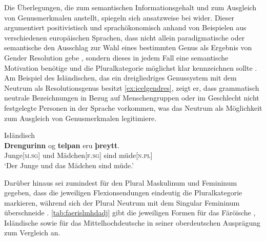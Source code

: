 Die Überlegungen, die \citeauthor{askedal1973} zum semantischen
Informationsgehalt und zum Ausgleich von Genusmerkmalen anstellt, spiegeln sich
ansatzweise bei \citet{corbett1991} wider. Dieser argumentiert positivistisch
und sprachökonomisch anhand von Beispielen aus verschiedenen europäischen
Sprachen, dass nicht allein paradigmatische oder semantische
 den Ausschlag zur Wahl eines bestimmten Genus als Ergebnis
von Gender Resolution gebe \autocite[290--293]{corbett1991}, sondern dieses
 in jedem Fall eine semantische Motivation benötige und
die Plural\-kategorie möglichst klar kennzeichnen sollte
\autocite[293--299]{corbett1991}. Am Beispiel des Isländischen, das ein
dreigliedriges Genussystem mit dem Neutrum als Resolutionsgenus besitzt
\cref{ex:icelgendres}, zeigt er, dass grammatisch neutrale Bezeichnungen in
Bezug auf Menschen\-gruppen oder im Geschlecht nicht festgelegte Personen in
der Sprache vorkommen, was das Neutrum als Möglichkeit zum Ausgleich von
Genusmerkmalen legiti\-miere.

\begin{exe}
\ex \label{ex:icelgendres}
	Isländisch \parencites[nach][283]{corbett1991}[569]{wechsler2009}\\
	\gll \textbf{Drengurinn} og \textbf{telpan} eru \textbf{þreytt}. \\
		Junge[\textsc{m.sg}] und Mädchen[\textsc{f.sg}] sind
		müde[\textsc{n.pl}] \\
	\trans `Der Junge und das Mädchen sind müde.'
\end{exe}

Darüber hinaus sei zumindest für den Plural Maskulinum und Femininum gegeben,
dass die jeweiligen Flexions\-endungen eindeutig die Pluralkategorie markieren,
während sich der Plural Neutrum mit dem Singular Femininum überschneide
\autocite[298--299]{corbett1991}. \cref{tab:faerislmhdadj} gibt die jeweiligen
Formen für das Färöische \autocite[100--101]{thrainsson2004}, Isländische
\autocite[84--90]{kress1982} sowie für
das Mittelhochdeutsche in seiner oberdeutschen Ausprägung \autocites[182]{ksw2}
zum Vergleich an.


